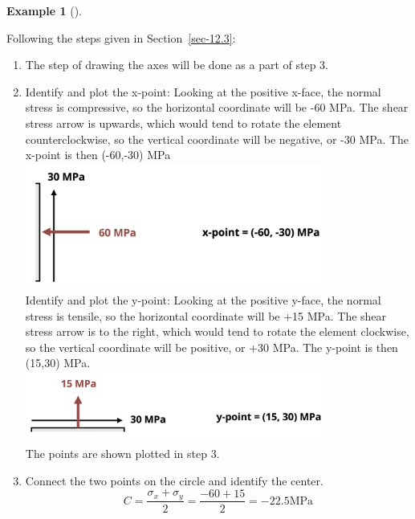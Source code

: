 \documentclass[
  letterpaper,
  DIV=11,
  numbers=noendperiod]{scrreprt}
\theoremstyle{definition}
\newtheorem{example}{Example}[chapter]
\theoremstyle{remark}
\begin{document}
\begin{tcolorbox}
\begin{example}[]
\begin{tcolorbox}
Following the steps given in Section~\ref{sec-12.3}:

\begin{enumerate}
\def\labelenumi{\arabic{enumi}.}
\item
  The step of drawing the axes will be done as a part of step 3.
\item
  Identify and plot the x-point: Looking at the positive x-face, the
  normal stress is compressive, so the horizontal coordinate will be -60
  MPa. The shear stress arrow is upwards, which would tend to rotate the
  element counterclockwise, so the vertical coordinate will be negative,
  or -30 MPa. The x-point is then (-60,-30) MPa\\
  \includegraphics[width=3.88542in,height=\textheight]{images/CH12 figures/example 12.4 part 2.png}\\
  Identify and plot the y-point: Looking at the positive y-face, the
  normal stress is tensile, so the horizontal coordinate will be +15
  MPa. The shear stress arrow is to the right, which would tend to
  rotate the element clockwise, so the vertical coordinate will be
  positive, or +30 MPa. The y-point is then (15,30) MPa.\\
  \includegraphics[width=3.89583in,height=\textheight]{images/CH12 figures/example 12.4 part 3.png}\\
  The points are shown plotted in step 3.
\item
  Connect the two points on the circle and identify the center.\\
  \[
  C=\frac{\sigma_x+\sigma_y}{2}=\frac{-60+15}{2}=-22.5 \mathrm{MPa}
  \]\\

\end{enumerate}
\end{tcolorbox}
\end{example}
\end{tcolorbox}
\end{document}
